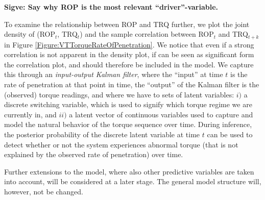 {\bf Sigve: Say why ROP is the most relevant ``driver''-variable.}





To examine the relationship between ROP and TRQ further, we plot the joint density of (ROP$_t$, TRQ$_t$) and the sample correlation between ROP$_t$ and TRQ$_{t+k}$ in Figure \ref{Figure:VTTorqueRateOfPenetration}. We notice that even if a strong correlation is not apparent in the density plot, if can be seen as significant form the correlation plot, and should therefore be included in the model. We capture this through an \textit{input-output Kalman filter}, where the ``input'' at time $t$ is the rate of penetration at that point in time, the ``output'' of the Kalman filter is the (observed) torque readings, and where we have to sets of latent variables: $i)$ a discrete switching variable, which is used to signify which torque regime we are currently in, and $ii)$ a latent vector of continuous variables used to capture and model the natural behavior of the torque sequence over time. During inference, the posterior probability of the discrete latent variable at time $t$ can be used to detect whether or not the system experiences abnormal torque (that is not explained by the observed rate of penetration) over time. 

Further extensions to the model, where also other predictive variables are taken into account, will be considered at a later stage. The general model structure will, however, not be changed.


